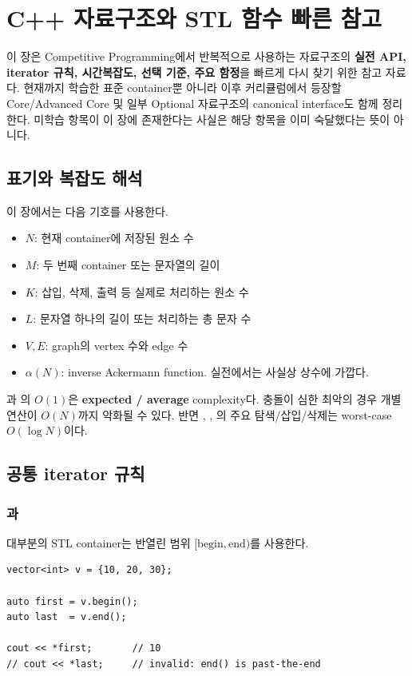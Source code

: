 \chapter{C++ 자료구조와 STL 함수 빠른 참고}

\begin{notebox}[이 Appendix의 목적]
이 장은 Competitive Programming에서 반복적으로 사용하는 자료구조의 \textbf{실전 API, iterator 규칙, 시간복잡도, 선택 기준, 주요 함정}을 빠르게 다시 찾기 위한 참고 자료다.
현재까지 학습한 표준 container뿐 아니라 이후 커리큘럼에서 등장할 Core/Advanced Core 및 일부 Optional 자료구조의 canonical interface도 함께 정리한다.
미학습 항목이 이 장에 존재한다는 사실은 해당 항목을 이미 숙달했다는 뜻이 아니다.
\end{notebox}

\section{표기와 복잡도 해석}
이 장에서는 다음 기호를 사용한다.
\begin{itemize}
  \item $N$: 현재 container에 저장된 원소 수
  \item $M$: 두 번째 container 또는 문자열의 길이
  \item $K$: 삽입, 삭제, 출력 등 실제로 처리하는 원소 수
  \item $L$: 문자열 하나의 길이 또는 처리하는 총 문자 수
  \item $V,E$: graph의 vertex 수와 edge 수
  \item $\alpha(N)$: inverse Ackermann function. 실전에서는 사실상 상수에 가깝다.
\end{itemize}

\begin{keybox}
과 의 $O(1)$은 \textbf{expected / average} complexity다. 충돌이 심한 최악의 경우 개별 연산이 $O(N)$까지 악화될 수 있다. 반면 , , 의 주요 탐색/삽입/삭제는 worst-case $O(\log N)$이다.
\end{keybox}

\section{공통 iterator 규칙}

\subsection{과 }
대부분의 STL container는 반열린 범위 $[\text{begin},\text{end})$를 사용한다.
\begin{lstlisting}
vector<int> v = {10, 20, 30};

auto first = v.begin();
auto last  = v.end();

cout << *first;       // 10
// cout << *last;     // invalid: end() is past-the-end
\end{lstlisting}

